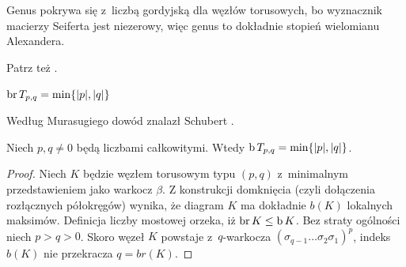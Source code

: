 Genus pokrywa się z~liczbą gordyjską dla węzłów torusowych, bo wyznacznik macierzy Seiferta jest niezerowy, więc genus to dokładnie stopień wielomianu Alexandera.

Patrz też \cite[s. 149]{murasugi96}.

\begin{proposition}
%
\label{prp:torus_bridge_number}%
    $\operatorname{br} T_{p, q} = \min \{|p|, |q|\}$
\end{proposition}

Według Murasugiego dowód znalazł Schubert \cite{schubert54}.
%

\begin{corollary}
%
\label{cor:torus_braid_number}%
    Niech $p, q \neq 0$ będą liczbami całkowitymi.
    Wtedy $\operatorname{b} T_{p, q} = \min \{|p|, |q|\}$.
\end{corollary}

\begin{proof}
    Niech $K$ będzie węzłem torusowym typu $(p,q)$ z~minimalnym przedstawieniem jako warkocz $\beta$.
    Z konstrukcji domknięcia (czyli dołączenia rozłącznych półokręgów) wynika,
    że diagram $K$ ma dokładnie $b(K)$ lokalnych maksimów.
    Definicja liczby mostowej orzeka, iż $\operatorname{br} K \le \operatorname{b} K$.
    Bez straty ogólności niech $p > q > 0$.
    Skoro węzeł $K$ powstaje z~$q$-warkocza $(\sigma_{q-1} \ldots \sigma_2\sigma_1)^p$,
    indeks $b(K)$ nie przekracza $q = br(K)$.
\end{proof}

%


